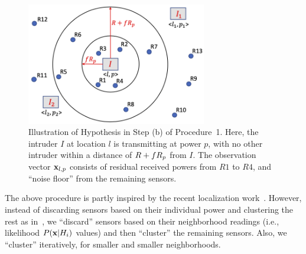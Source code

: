 \begin{figure}
	\centering
	\includegraphics[width=0.7\textwidth]{chapters/ipsn/figures/mmap.png}
	\caption{Illustration of Hypothesis \hlp in Step (b) of
          Procedure~1. Here, the intruder $I$ at location $l$ is
          transmitting at power $p$, with no other intruder within a
          distance of $R + fR_p$ from $I$. The observation vector
          $\mathbf{x}_{l,p}$ consists of residual received powers from $R1$ to
          $R4$, and ``noise floor'' from the remaining sensors.}
	\label{fig:mmap}
\end{figure}

The above procedure is partly inspired by the recent localization
work~\cite{clustering}. However, instead of discarding sensors based
on their individual power and clustering the rest as
in~\cite{clustering}, we ``discard'' sensors based on their
neighborhood readings (i.e., likelihood $P(\mathbf{x}| H_i)$ values) and then
``cluster'' the remaining sensors. Also, we ``cluster'' iteratively,
for smaller and smaller neighborhoods.


